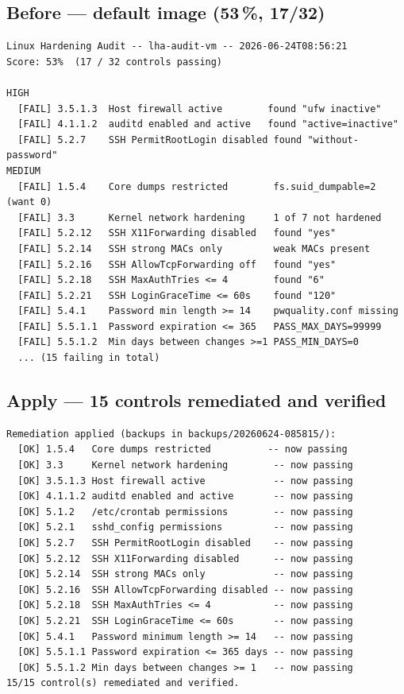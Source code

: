 \documentclass[11pt,a4paper]{article}
\begin{document}
\subsection{Before --- default image (53\,\%, 17/32)}
\begin{lstlisting}[style=console]
Linux Hardening Audit -- lha-audit-vm -- 2026-06-24T08:56:21
Score: 53%  (17 / 32 controls passing)

HIGH
  [FAIL] 3.5.1.3  Host firewall active        found "ufw inactive"
  [FAIL] 4.1.1.2  auditd enabled and active   found "active=inactive"
  [FAIL] 5.2.7    SSH PermitRootLogin disabled found "without-password"
MEDIUM
  [FAIL] 1.5.4    Core dumps restricted        fs.suid_dumpable=2 (want 0)
  [FAIL] 3.3      Kernel network hardening     1 of 7 not hardened
  [FAIL] 5.2.12   SSH X11Forwarding disabled   found "yes"
  [FAIL] 5.2.14   SSH strong MACs only         weak MACs present
  [FAIL] 5.2.16   SSH AllowTcpForwarding off   found "yes"
  [FAIL] 5.2.18   SSH MaxAuthTries <= 4        found "6"
  [FAIL] 5.2.21   SSH LoginGraceTime <= 60s    found "120"
  [FAIL] 5.4.1    Password min length >= 14    pwquality.conf missing
  [FAIL] 5.5.1.1  Password expiration <= 365   PASS_MAX_DAYS=99999
  [FAIL] 5.5.1.2  Min days between changes >=1 PASS_MIN_DAYS=0
  ... (15 failing in total)
\end{lstlisting}

\subsection{Apply --- 15 controls remediated and verified}
\begin{lstlisting}[style=console]
Remediation applied (backups in backups/20260624-085815/):
  [OK] 1.5.4   Core dumps restricted          -- now passing
  [OK] 3.3     Kernel network hardening        -- now passing
  [OK] 3.5.1.3 Host firewall active            -- now passing
  [OK] 4.1.1.2 auditd enabled and active       -- now passing
  [OK] 5.1.2   /etc/crontab permissions        -- now passing
  [OK] 5.2.1   sshd_config permissions         -- now passing
  [OK] 5.2.7   SSH PermitRootLogin disabled    -- now passing
  [OK] 5.2.12  SSH X11Forwarding disabled      -- now passing
  [OK] 5.2.14  SSH strong MACs only            -- now passing
  [OK] 5.2.16  SSH AllowTcpForwarding disabled -- now passing
  [OK] 5.2.18  SSH MaxAuthTries <= 4           -- now passing
  [OK] 5.2.21  SSH LoginGraceTime <= 60s       -- now passing
  [OK] 5.4.1   Password minimum length >= 14   -- now passing
  [OK] 5.5.1.1 Password expiration <= 365 days -- now passing
  [OK] 5.5.1.2 Min days between changes >= 1   -- now passing
15/15 control(s) remediated and verified.
\end{lstlisting}
\end{document}
